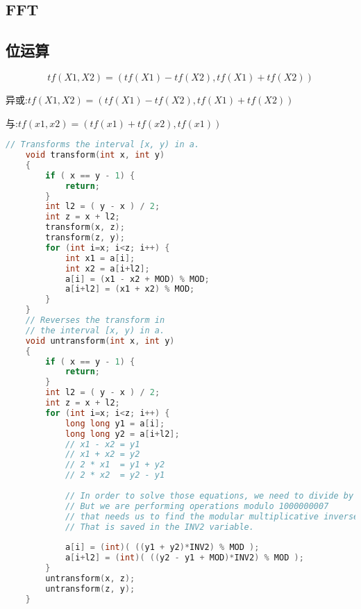 \subsection{FFT}
	\subsection{位运算}
$$tf(X1,X2) = (tf(X1) - tf(X2), tf(X1) + tf(X2))$$

异或:$tf(X1,X2) = (tf(X1) - tf(X2), tf(X1) + tf(X2))$ 

与:$tf(x1,x2)=(tf(x1) + tf(x2), tf(x1))$
	\begin{lstlisting}[language=c++]
// Transforms the interval [x, y) in a.
    void transform(int x, int y)
    {
        if ( x == y - 1) {
            return;
        }
        int l2 = ( y - x ) / 2;
        int z = x + l2;
        transform(x, z);
        transform(z, y);
        for (int i=x; i<z; i++) {
            int x1 = a[i];
            int x2 = a[i+l2];
            a[i] = (x1 - x2 + MOD) % MOD;
            a[i+l2] = (x1 + x2) % MOD;
        }
    }
    // Reverses the transform in
    // the interval [x, y) in a.
    void untransform(int x, int y)
    {
        if ( x == y - 1) {
            return;
        }
        int l2 = ( y - x ) / 2;
        int z = x + l2;
        for (int i=x; i<z; i++) {
            long long y1 = a[i];
            long long y2 = a[i+l2];
            // x1 - x2 = y1
            // x1 + x2 = y2
            // 2 * x1  = y1 + y2
            // 2 * x2  = y2 - y1
            
            // In order to solve those equations, we need to divide by 2
            // But we are performing operations modulo 1000000007
            // that needs us to find the modular multiplicative inverse of 2.
            // That is saved in the INV2 variable.
            
            a[i] = (int)( ((y1 + y2)*INV2) % MOD );
            a[i+l2] = (int)( ((y2 - y1 + MOD)*INV2) % MOD );
        }
        untransform(x, z);
        untransform(z, y);
    }
	\end{lstlisting}

